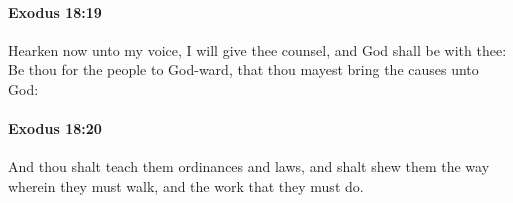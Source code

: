 		\paragraph{Exodus 18:19} %
			\label{EXODUS-18-19}

			Hearken now unto my voice, I will give thee counsel, and God shall be with thee: Be thou for the people to God-ward, that thou mayest bring the causes unto God:


		\paragraph{Exodus 18:20} %
			\label{EXODUS-18-20}

			And thou shalt teach them ordinances and laws, and shalt shew them the way wherein they must walk, and the work that they must do.


